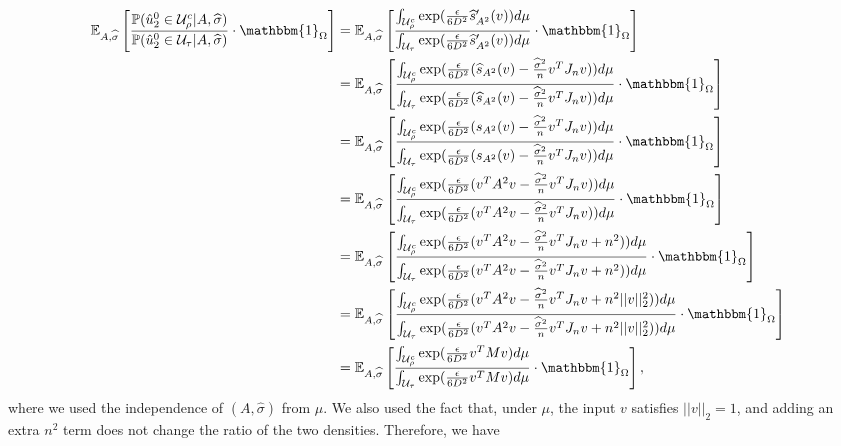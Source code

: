 \documentclass{article}
\newcommand{\sigmahat}{\ensuremath{\widehat{\sigma}}}
\begin{document}
\begin{align*}
\mathbb{E}_{A, \sigmahat}\left[\frac{\mathbb{P}(\hat{u}_2^0 \in \mathcal{U}_\rho^c|A, \sigmahat)}{\mathbb{P}(\hat{u}_2^0 \in \mathcal{U_\tau}|A, \sigmahat)}\cdot \mathbbm{1}_{\Omega}\right] &= \mathbb{E}_{A, \sigmahat}\left[\frac{\int_{\mathcal{U}^c_\rho}\mathrm{exp}(\frac{\epsilon}{6D^2}\widehat{s}'_{A^2}(v))d\mu}{\int_{\mathcal{U}_\tau}\mathrm{exp}(\frac{\epsilon}{6D^2}\widehat{s}'_{A^2}(v))d\mu}\cdot \mathbbm{1}_{\Omega}\right] \\
%
& = \mathbb{E}_{A, \sigmahat}\left[\frac{\int_{\mathcal{U}^c_\rho}\mathrm{exp}(\frac{\epsilon}{6D^2}(\widehat{s}_{A^2}(v) - \frac{\sigmahat^2}{n}v^TJ_nv))d\mu}{\int_{\mathcal{U}_\tau}\mathrm{exp}(\frac{\epsilon}{6D^2}(\widehat{s}_{A^2}(v) - \frac{\sigmahat^2}{n}v^TJ_nv))d\mu}\cdot \mathbbm{1}_{\Omega}\right]\\
&= \mathbb{E}_{A, \sigmahat}\left[\frac{\int_{\mathcal{U}^c_\rho}\mathrm{exp}(\frac{\epsilon}{6D^2}(s_{A^2}(v) - \frac{\sigmahat^2}{n}v^TJ_nv))d\mu}{\int_{\mathcal{U}_\tau}\mathrm{exp}(\frac{\epsilon}{6D^2}(s_{A^2}(v) - \frac{\sigmahat^2}{n}v^TJ_nv))d\mu}\cdot \mathbbm{1}_{\Omega}\right]\\
&= \mathbb{E}_{A, \sigmahat}\left[\frac{\int_{\mathcal{U}^c_\rho}\mathrm{exp}(\frac{\epsilon}{6D^2}(v^TA^2v - \frac{\sigmahat^2}{n}v^TJ_nv))d\mu}{\int_{\mathcal{U}_\tau}\mathrm{exp}(\frac{\epsilon}{6D^2}(v^TA^2v - \frac{\sigmahat^2}{n}v^TJ_nv))d\mu}\cdot \mathbbm{1}_{\Omega}\right]\\
&= \mathbb{E}_{A, \sigmahat}\left[\frac{\int_{\mathcal{U}^c_\rho}\mathrm{exp}(\frac{\epsilon}{6D^2}(v^TA^2v - \frac{\sigmahat^2}{n}v^TJ_nv + n^2))d\mu}{\int_{\mathcal{U}_\tau}\mathrm{exp}(\frac{\epsilon}{6D^2}(v^TA^2v - \frac{\sigmahat^2}{n}v^TJ_nv + n^2))d\mu}\cdot \mathbbm{1}_{\Omega}\right]\\
&= \mathbb{E}_{A, \sigmahat}\left[\frac{\int_{\mathcal{U}^c_\rho}\mathrm{exp}(\frac{\epsilon}{6D^2}(v^TA^2v - \frac{\sigmahat^2}{n}v^TJ_nv + n^2||v||_2^2))d\mu}{\int_{\mathcal{U}_\tau}\mathrm{exp}(\frac{\epsilon}{6D^2}(v^TA^2v - \frac{\sigmahat^2}{n}v^TJ_nv + n^2||v||_2^2))d\mu}\cdot \mathbbm{1}_{\Omega}\right]\\
&= \mathbb{E}_{A, \sigmahat}\left[\frac{\int_{\mathcal{U}^c_\rho}\mathrm{exp}(\frac{\epsilon}{6D^2}v^TMv)d\mu}{\int_{\mathcal{U}_\tau}\mathrm{exp}(\frac{\epsilon}{6D^2}v^TMv)d\mu}\cdot \mathbbm{1}_{\Omega}\right],
\end{align*}
where we used the independence of $(A, \sigmahat)$ from $\mu$. We also used the fact that, under $\mu$, the input $v$ satisfies $||v||_2 = 1$, and adding an extra $n^2$ term does not change the ratio of the two densities. Therefore, we have
\end{document}
